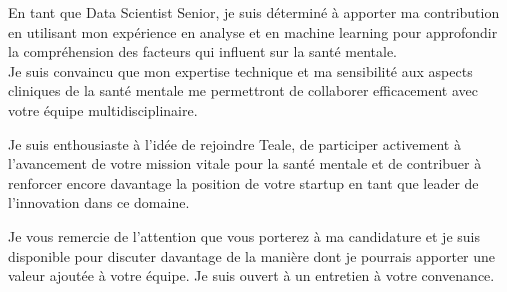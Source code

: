 \documentclass[11pt, a4paper]{awesome-cv}
\begin{document}
\begin{cvletter}
En tant que Data Scientist Senior, je suis déterminé à apporter ma contribution en utilisant mon expérience en analyse et en machine learning pour approfondir la compréhension des facteurs qui influent sur la santé mentale. \\
Je suis convaincu que mon expertise technique et ma sensibilité aux aspects cliniques de la santé mentale me permettront de collaborer efficacement avec votre équipe multidisciplinaire.

Je suis enthousiaste à l'idée de rejoindre Teale, de participer activement à l'avancement de votre mission vitale pour la santé mentale et de contribuer à renforcer encore davantage la position de votre startup en tant que leader de l'innovation dans ce domaine.

Je vous remercie de l'attention que vous porterez à ma candidature et je suis disponible pour discuter davantage de la manière dont je pourrais apporter une valeur ajoutée à votre équipe.
Je suis ouvert à un entretien à votre convenance.



\end{cvletter}


\makeletterclosing
\end{document}
